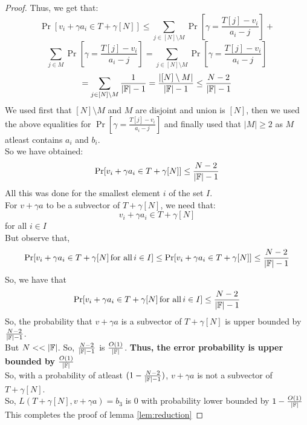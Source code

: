 \begin{proof}
    Thus, we get that:
    $$\Pr[v_i +\gamma a_i \in T+\gamma[N]] \leq \sum_{j \in [N]\setminus M} \Pr\left[\gamma = \frac{T[j]-v_i}{a_i-j}\right]+$$
    $$\sum_{j \in M} \Pr\left[\gamma = \frac{T[j]-v_i}{a_i-j}\right]=\sum_{j \in [N]\setminus M} \Pr\left[\gamma = \frac{T[j]-v_i}{a_i-j}\right]$$
    $$=\sum_{j \in [N]\setminus M} \frac{1}{|\mathbb{F}|-1}=\frac{|[N]\setminus M|}{|\mathbb{F}|-1} \leq \frac{N-2}{|\mathbb{F}|-1}$$
    We used first that $[N]\setminus M$ and $M$ are disjoint and union is $[N]$, then we used the above equalities for $\Pr\left[\gamma = \frac{T[j]-v_i}{a_i-j}\right]$ and finally used that $|M| \geq 2$ as $M$ atleast contains $a_i$ and $b_i$.\\
    So we have obtained:
    $$\Pr[v_i +\gamma a_i \in T+\gamma[N]] \leq \frac{N-2}{|\mathbb{F}|-1}$$
    All this was done for the smallest element $i$ of the set $I$.\\
    For $v+\gamma a$ to be a subvector of $T+\gamma [N]$, we need that:
    $$v_i +\gamma a_i \in T+\gamma[N]$$ for all $i \in I$\\
    But observe that,
    $$\Pr[v_i +\gamma a_i \in T+\gamma[N] \, \text{for all} \, i \in I] \leq \Pr[v_i +\gamma a_i \in T+\gamma[N]] \leq \frac{N-2}{|\mathbb{F}|-1}$$
    So, we have that $$\Pr[v_i +\gamma a_i \in T+\gamma[N] \, \text{for all} \,i \in I] \leq \frac{N-2}{|\mathbb{F}|-1}$$
    So, the probability that $v+\gamma a$ is a subvector of $T+\gamma [N]$ is upper bounded by $\frac{N-2}{|\mathbb{F}|-1}$. \\
    But $N <<|\F|$. So, $\frac{N-2}{|\mathbb{F}|-1}$ is $\frac{O(1)}{|\mathbb{F}|}$. \textbf{Thus, the error probability is upper bounded by $\frac{O(1)}{|\mathbb{F}|}$} \\
    So, with a probability of atleast $(1-\frac{N-2}{|\mathbb{F}|-1})$, $v+\gamma a$ is not a subvector of $T+\gamma [N]$. \\
    So, $L(T+\gamma[N], v+\gamma a)=b_3$ is 0 with probability lower bounded by $1-\frac{O(1)}{|\mathbb{F}|}$ \\
    This completes the proof of lemma \ref{lem:reduction}
\end{proof}